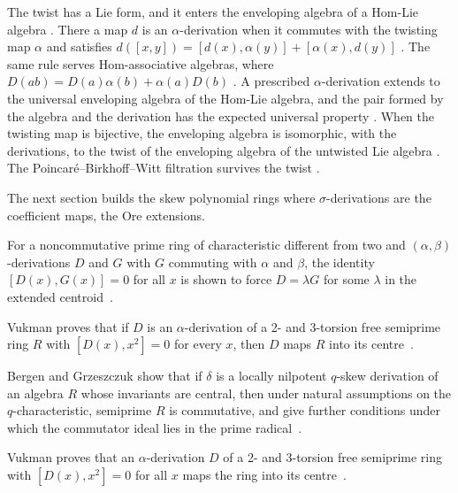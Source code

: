 The twist has a Lie form, and it enters the enveloping algebra of a Hom-Lie
algebra \cite[p.~4]{JiangKangLu2026}. There a map $d$ is an $\alpha$-derivation
when it commutes with the twisting map $\alpha$ and satisfies
$d([x,y])=[d(x),\alpha(y)]+[\alpha(x),d(y)]$ \cite[Definition~2.3, p.~4]{JiangKangLu2026}.
The same rule serves Hom-associative algebras, where
$D(ab)=D(a)\alpha(b)+\alpha(a)D(b)$ \cite[Definition~2.9, p.~5]{JiangKangLu2026}.
A prescribed $\alpha$-derivation extends to the universal enveloping algebra of
the Hom-Lie algebra, and the pair formed by the algebra and the derivation has
the expected universal property \cite[Theorem~3.11, p.~13]{JiangKangLu2026}.
When the twisting map is bijective, the enveloping algebra is isomorphic, with
the derivations, to the twist of the enveloping algebra of the untwisted Lie
algebra \cite[Theorem~4.8, p.~18]{JiangKangLu2026}. The Poincar\'e--Birkhoff--Witt
filtration survives the twist \cite[Theorem~4.10, p.~19]{JiangKangLu2026}.

The next section builds
the skew polynomial rings where $\sigma$-derivations are the coefficient
maps, the Ore extensions.

For a noncommutative prime ring of characteristic different from two and $(\alpha,\beta)$-derivations $D$ and $G$ with $G$ commuting with $\alpha$ and $\beta$, the identity $[D(x),G(x)]=0$ for all $x$ is shown to force $D=\lambda G$ for some $\lambda$ in the extended centroid~\cite{WlIdentitiesWithProductsOfAlphaB2006}.

Vukman proves that if $D$ is an $\alpha$-derivation of a 2- and 3-torsion free semiprime ring $R$ with $[D(x),x^2]=0$ for every $x$, then $D$ maps $R$ into its centre~\cite{WlOnADerivationsOfPrimeAndSemipr2005}.

Bergen and Grzeszczuk show that if $\delta$ is a locally nilpotent $q$-skew derivation of an algebra $R$ whose invariants are central, then under natural assumptions on the $q$-characteristic, semiprime $R$ is commutative, and give further conditions under which the commutator ideal lies in the prime radical~\cite{WlLocallyNilpotentSkewDerivation2017}.

Vukman proves that an $\alpha$-derivation $D$ of a 2- and 3-torsion free semiprime ring with $[D(x),x^2]=0$ for all $x$ maps the ring into its centre~\cite{WlFreeActionsOfSemiprimeRingsWit2005}.
